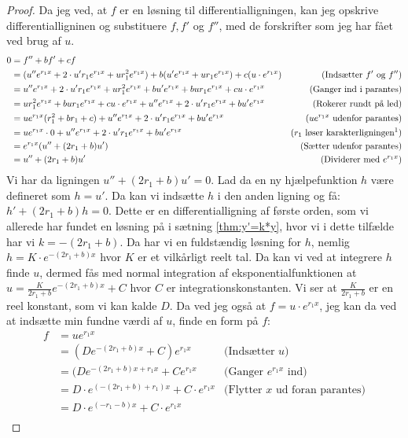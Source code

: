 \begin{proof}
Da jeg ved, at $f$ er en løsning til differentialligningen, kan jeg opskrive differentialligninen og substituere $f, f'$ og $f''$, med de forskrifter som jeg har fået ved brug af $u$. 
\begin{align*}
0 	&= f'' + bf' + cf \\
	&= (u''e^{r_1 x} + 2\cdot u' r_1 e^{r_1 x} + u r_1^2 e^{r_1 x}) + b(u'e^{r_1 x} + ur_1 e^{r_1 x}) + c (u \cdot e^{r_1 x}) &\text{(Indsætter $f'$ og $f''$)}\\
	&= u''e^{r_1 x} + 2\cdot u' r_1 e^{r_1 x} + u r_1^2 e^{r_1 x} + bu'e^{r_1 x} + bur_1 e^{r_1 x} + cu \cdot e^{r_1 x}&\text{(Ganger ind i parantes)}\\
	&= u r_1^2 e^{r_1 x} + bur_1 e^{r_1 x} + cu \cdot e^{r_1 x} + u''e^{r_1 x} + 2\cdot u' r_1 e^{r_1 x} + bu'e^{r_1 x}  & \text{(Rokerer rundt på led)}\\
	&= ue^{r_1 x}(r_1^2  + br_1 + c) + u''e^{r_1 x} + 2\cdot u' r_1 e^{r_1 x} + bu'e^{r_1 x} & \text{($ue^{r_1 x}$ udenfor  parantes)}\\
	&= ue^{r_1 x} \cdot 0+ u''e^{r_1 x} + 2\cdot u' r_1 e^{r_1 x} + bu'e^{r_1 x} & \text{($r_1$ løser karakterligningen\footnotemark)}\\
	&= e^{r_1 x} (u'' + (2r_1 + b)u') & \text{(Sætter udenfor parantes)}\\
	&= u'' + (2r_1 + b)u' & \text{(Dividerer med $e^{r_1 x}$)}
\end{align*}
Vi har da ligningen $u'' + (2r_1 + b)u' = 0$. 
Lad da en ny hjælpefunktion $h$ være defineret som $h = u'$. 
Da kan vi indsætte $h$ i den anden ligning og få:
$h' + (2r_1 + b)h = 0$. 
Dette er en differentialligning af første orden, som vi allerede har fundet en løsning på i sætning \ref{thm:y'=k*y}, 
hvor vi i dette tilfælde har vi $k = -(2r_1 + b)$.
Da har vi en fuldstændig løsning for $h$, nemlig $h=K \cdot e^{-(2r_1 + b)x}$ hvor $K$ er et vilkårligt reelt tal. 
Da kan vi ved at integrere $h$ finde $u$, dermed fås med normal integration af eksponentialfunktionen at $u = \frac{K}{2r_1 + b} e^{-(2r_1 + b)x} + C$ hvor $C$ er integrationskonstanten. 
Vi ser at $\frac{K}{2r_1 + b}$ er en reel konstant, som vi kan kalde $D$.
Da ved jeg også at $f=u\cdot e^{r_1 x}$, jeg kan da ved at indsætte min fundne værdi af $u$, finde en form på $f$:
\begin{align*}
f 	&= ue^{r_1 x}\\
	&= (D e^{-(2r_1 + b)x} + C)e^{r_1 x} &\text{(Indsætter $u$)}\\
	&= (D e^{-(2r_1 + b)x + r_1 x} + Ce^{r_1 x} &\text{(Ganger $e^{r_1 x}$ ind)}\\
	&= D \cdot e^{(-(2r_1 + b)+r_1)x} + C\cdot e^{r_1 x}&\text{(Flytter $x$ ud foran parantes)}\\
	&= D \cdot e^{(-r_1 - b)x} + C\cdot e^{r_1 x}\\
\end{align*}


\end{proof}
